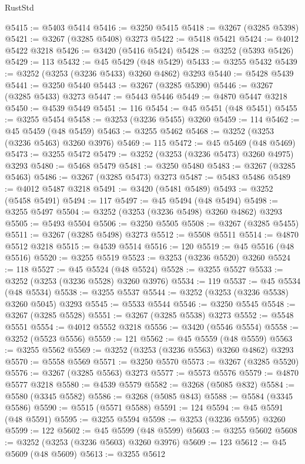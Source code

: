\begin{lexlean}{RustStd}
\begin{coremodule}
@5415 := @5403 @5414
@5416 := @3250 @5415
@5418 := @3267 (@3285 @5398)
@5421 := @3267 (@3285 @5408) @3273
@5422 := @5418 @5421
@5424 := @4012 @5422 @3218
@5426 := @3420 (@5416 @5424)
@5428 := @3252 (@5393 @5426)
@5429 := 113
@5432 := @45 @5429 (@48 @5429)
@5433 := @3255 @5432
@5439 := @3252 (@3253 (@3236 @5433) @3260 @4862) @3293
@5440 := @5428 @5439
@5441 := @3250 @5440
@5443 := @3267 (@3285 @5390)
@5446 := @3267 (@3285 @5433) @3273
@5447 := @5443 @5446
@5449 := @4870 @5447 @3218
@5450 := @4539 @5449
@5451 := 116
@5454 := @45 @5451 (@48 @5451)
@5455 := @3255 @5454
@5458 := @3253 (@3236 @5455) @3260
@5459 := 114
@5462 := @45 @5459 (@48 @5459)
@5463 := @3255 @5462
@5468 := @3252 (@3253 (@3236 @5463) @3260 @3976)
@5469 := 115
@5472 := @45 @5469 (@48 @5469)
@5473 := @3255 @5472
@5479 := @3252 (@3253 (@3236 @5473) @3260 @4975) @3293
@5480 := @5468 @5479
@5481 := @3250 @5480
@5483 := @3267 (@3285 @5463)
@5486 := @3267 (@3285 @5473) @3273
@5487 := @5483 @5486
@5489 := @4012 @5487 @3218
@5491 := @3420 (@5481 @5489)
@5493 := @3252 (@5458 @5491)
@5494 := 117
@5497 := @45 @5494 (@48 @5494)
@5498 := @3255 @5497
@5504 := @3252 (@3253 (@3236 @5498) @3260 @4862) @3293
@5505 := @5493 @5504
@5506 := @3250 @5505
@5508 := @3267 (@3285 @5455)
@5511 := @3267 (@3285 @5498) @3273
@5512 := @5508 @5511
@5514 := @4870 @5512 @3218
@5515 := @4539 @5514
@5516 := 120
@5519 := @45 @5516 (@48 @5516)
@5520 := @3255 @5519
@5523 := @3253 (@3236 @5520) @3260
@5524 := 118
@5527 := @45 @5524 (@48 @5524)
@5528 := @3255 @5527
@5533 := @3252 (@3253 (@3236 @5528) @3260 @3976)
@5534 := 119
@5537 := @45 @5534 (@48 @5534)
@5538 := @3255 @5537
@5544 := @3252 (@3253 (@3236 @5538) @3260 @5045) @3293
@5545 := @5533 @5544
@5546 := @3250 @5545
@5548 := @3267 (@3285 @5528)
@5551 := @3267 (@3285 @5538) @3273
@5552 := @5548 @5551
@5554 := @4012 @5552 @3218
@5556 := @3420 (@5546 @5554)
@5558 := @3252 (@5523 @5556)
@5559 := 121
@5562 := @45 @5559 (@48 @5559)
@5563 := @3255 @5562
@5569 := @3252 (@3253 (@3236 @5563) @3260 @4862) @3293
@5570 := @5558 @5569
@5571 := @3250 @5570
@5573 := @3267 (@3285 @5520)
@5576 := @3267 (@3285 @5563) @3273
@5577 := @5573 @5576
@5579 := @4870 @5577 @3218
@5580 := @4539 @5579
@5582 := @3268 (@5085 @832)
@5584 := @5580 (@3345 @5582)
@5586 := @3268 (@5085 @843)
@5588 := @5584 (@3345 @5586)
@5590 := @5515 (@5571 @5588)
@5591 := 124
@5594 := @45 @5591 (@48 @5591)
@5595 := @3255 @5594
@5598 := @3253 (@3236 @5595) @3260
@5599 := 122
@5602 := @45 @5599 (@48 @5599)
@5603 := @3255 @5602
@5608 := @3252 (@3253 (@3236 @5603) @3260 @3976)
@5609 := 123
@5612 := @45 @5609 (@48 @5609)
@5613 := @3255 @5612

\end{coremodule}
\end{lexlean}
